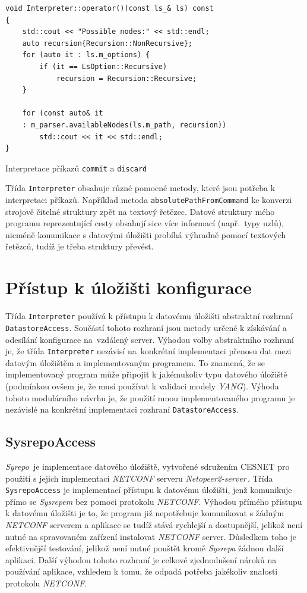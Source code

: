 \documentclass[thesis=B,czech,hidelinks]{FITthesis}[2019/03/06]
\begin{document}
\begin{listing}[H]
\begin{verbatim}
void Interpreter::operator()(const ls_& ls) const
{
    std::cout << "Possible nodes:" << std::endl;
    auto recursion{Recursion::NonRecursive};
    for (auto it : ls.m_options) {
        if (it == LsOption::Recursive)
            recursion = Recursion::Recursive;
    }

    for (const auto& it
    : m_parser.availableNodes(ls.m_path, recursion))
        std::cout << it << std::endl;
}
\end{verbatim}
\caption{Interpretace příkazů \texttt{commit} a \texttt{discard}}\label{interpreter:ls}
\end{listing}


Třída \texttt{Interpreter} obsahuje různé pomocné metody, které jsou potřeba k interpretaci příkazů. Například metoda \texttt{absolutePathFromCommand} ke konverzi strojově čitelné struktury zpět na textový řetězec. Datové struktury mého programu reprezentující cesty obsahují sice více informací (např.\ typy uzlů), nicméně komunikace s datovými úložišti probíhá výhradně pomocí textových řetězců, tudíž je třeba struktury převést.


\section{Přístup k úložišti konfigurace}\label{datastore:access}
Třída \texttt{Interpreter} používá k přístupu k datovému úložišti abstraktní rozhraní \texttt{DatastoreAccess}. Součástí tohoto rozhraní jsou metody určené k získávání a odesílání konfigurace na~vzdálený server. Výhodou volby abstraktního rozhraní je, že třída \texttt{Interpreter} nezávisí na~konkrétní implementaci přenosu dat mezi datovým úložištěm a implementovaným programem. To znamená, že se implementovaný program může připojit k jakémukoliv typu datového úložiště (podmínkou ovšem je, že musí používat k validaci modely \textit{YANG}). Výhoda tohoto modulárního návrhu je, že použití mnou implementovaného programu je nezávislé na konkrétní implementaci rozhraní \texttt{DatastoreAccess}.

\subsection{SysrepoAccess}
\textit{Syrepo}\,\cite{sysrepo} je implementace datového úložiště, vytvořené sdružením CESNET pro použití s jejich implementací \textit{NETCONF} serveru \textit{Netopeer2-server}\,\cite{netopeer-server}. Třída \texttt{SysrepoAccess} je implementací přístupu k datovému úložišti, jenž komunikuje přímo se \textit{Sysrepem} bez pomoci protokolu \textit{NETCONF}. Výhodou přímého přístupu k datovému úložišti je to, že program již nepotřebuje komunikovat s žádným \textit{NETCONF} serverem a aplikace se tudíž stává rychlejší a dostupnější, jelikož není nutné na spravovaném zařízení instalovat \textit{NETCONF} server. Důsledkem toho je efektivnější testování, jelikož není nutné pouštět kromě \textit{Sysrepa} žádnou další aplikaci. Další výhodou tohoto rozhraní je celkové zjednodušení nároků na používání aplikace, vzhledem k tomu, že odpadá potřeba jakékoliv znalosti protokolu \textit{NETCONF}.
\end{document}
